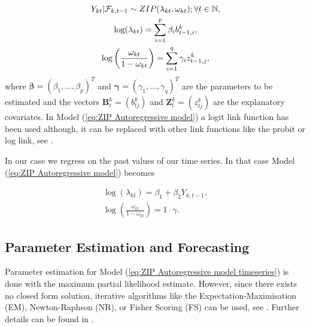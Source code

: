 \begin{equation}
\begin{gathered}
Y_{kt} | \SigA_{k,t-1} \sim ZIP(\lambda_{kt},\omega_{kt}); \forall t \in \mathbb{N}, \\
\log(\lambda_{kt}) = \sum_{i=1}^p\beta_i b^k_{t-1,i},\\ %
\log\left(\frac{\omega_{kt}}{1-\omega_{kt}}\right)=\sum_{i=1}^q\gamma_i z^k_{t-1,j},%
\label{eq:ZIP Autoregressive model}
\end{gathered}
\end{equation}
%
where $\bm{\beta} = (\beta_1,\ldots,\beta_p)^T$ and $\bm{\gamma}=(\gamma_1,\ldots,\gamma_q)^T$ are the parameters to be estimated and the vectors $\bm{B}^k_t=(b^k_{tj})$ and $\bm{Z}^k_{t}=(z^k_{tj})$ are the explanatory covariates. In Model (\ref{eq:ZIP Autoregressive model}) a logit link function has been used although, it can be replaced with other link functions like the probit or log link, see \textcite{Yang:2012}. 

In our case we regress on the past values of our time series. In that case Model (\ref{eq:ZIP Autoregressive model}) becomes

\begin{equation}
\begin{gathered}
\log(\lambda_{kt}) = \beta_1 + \beta_2 Y_{k,t-1},\\%
\log\left(\frac{\omega_{kt}}{1-\omega_{kt}}\right)= 1 \cdot \gamma.
\label{eq:ZIP Autoregressive model timeseries}
\end{gathered}
\end{equation}


\subsection{Parameter Estimation and Forecasting}
\label{sec: ZIM Parameter Estimation and Forecasting}

Parameter estimation for Model (\ref{eq:ZIP Autoregressive model timeseries}) is done with the maximum partial likelihood estimate. However, since there exists no closed form solution, iterative algorithms like the Expectation-Maximisation (EM), Newton-Raphson (NR), or Fisher Scoring (FS) can be used, see \textcite{Yang:2012}.  Further details can be found in \textcite{Yang:2012}.

